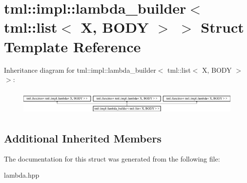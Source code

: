 \hypertarget{structtml_1_1impl_1_1lambda__builder_3_01tml_1_1list_3_01X_00_01BODY_01_4_01_4}{\section{tml\+:\+:impl\+:\+:lambda\+\_\+builder$<$ tml\+:\+:list$<$ X, B\+O\+D\+Y $>$ $>$ Struct Template Reference}
\label{structtml_1_1impl_1_1lambda__builder_3_01tml_1_1list_3_01X_00_01BODY_01_4_01_4}
}
Inheritance diagram for tml\+:\+:impl\+:\+:lambda\+\_\+builder$<$ tml\+:\+:list$<$ X, B\+O\+D\+Y $>$ $>$\+:\begin{figure}[H]
\begin{center}
\leavevmode
\includegraphics[height=1.274175cm]{structtml_1_1impl_1_1lambda__builder_3_01tml_1_1list_3_01X_00_01BODY_01_4_01_4}
\end{center}
\end{figure}
\subsection*{Additional Inherited Members}


The documentation for this struct was generated from the following file\+:\begin{DoxyCompactItemize}
\item 
lambda.\+hpp\end{DoxyCompactItemize}
